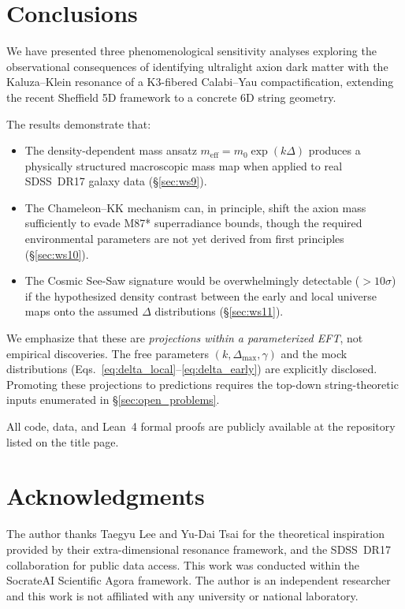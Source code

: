 \documentclass[12pt]{article}
\begin{document}
\section{Conclusions}
\label{sec:conclusions}

We have presented three phenomenological sensitivity analyses exploring the observational consequences of identifying ultralight axion dark matter with the Kaluza--Klein resonance of a K3-fibered Calabi--Yau compactification, extending the recent Sheffield 5D framework to a concrete 6D string geometry.

The results demonstrate that:
\begin{itemize}
\item The density-dependent mass ansatz $m_{\mathrm{eff}} = m_0 \exp(k\Delta)$ produces a physically structured macroscopic mass map when applied to real SDSS~DR17 galaxy data (\S\ref{sec:ws9}).
\item The Chameleon--KK mechanism can, in principle, shift the axion mass sufficiently to evade M87* superradiance bounds, though the required environmental parameters are not yet derived from first principles (\S\ref{sec:ws10}).
\item The Cosmic See-Saw signature would be overwhelmingly detectable ($> 10\sigma$) if the hypothesized density contrast between the early and local universe maps onto the assumed $\Delta$ distributions (\S\ref{sec:ws11}).
\end{itemize}

We emphasize that these are \emph{projections within a parameterized EFT}, not empirical discoveries.
The free parameters $(k, \Delta_{\max}, \gamma)$ and the mock distributions (Eqs.~\ref{eq:delta_local}--\ref{eq:delta_early}) are explicitly disclosed.
Promoting these projections to predictions requires the top-down string-theoretic inputs enumerated in \S\ref{sec:open_problems}.

All code, data, and Lean~4 formal proofs are publicly available at the repository listed on the title page.

\section*{Acknowledgments}

The author thanks Taegyu Lee and Yu-Dai Tsai for the theoretical inspiration provided by their extra-dimensional resonance framework, and the SDSS~DR17 collaboration for public data access.
This work was conducted within the SocrateAI Scientific Agora framework.
The author is an independent researcher and this work is not affiliated with any university or national laboratory.
\end{document}
